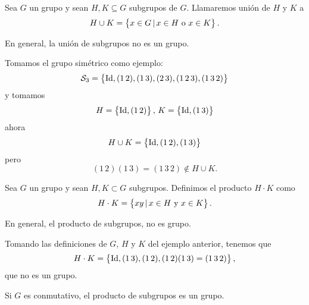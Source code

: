 \begin{defi}
    Sea $G$ un grupo y sean $H, K \subseteq G$ subgrupos de $G$. Llamaremos unión de $H$ y $K$ a
    \[
        H \cup K = \left\{x \in G \, \vert\, x \in H \text{ o } x \in K\right\}.
    \]
\end{defi}

\begin{obs}
    En general, la unión de subgrupos no es un grupo.
\end{obs}

\begin{example}
    Tomamos el grupo simétrico como ejemplo:
    \[
        \mathcal{S}_3 = \left\{ \operatorname{Id}, (1 \, 2), (1 \, 3), (2 \, 3), (1 \, 2 \, 3), (1 \, 3 \, 2)\right\}
    \]
    y tomamos
    \[
        H = \left\{\operatorname{Id}, (1 \, 2)\right\}, \, K = \left\{\operatorname{Id}, (1 \, 3)\right\}
    \]
    ahora
    \[
        H \cup K = \left\{\operatorname{Id}, (1 \, 2), (1\, 3)\right\}
    \]
    pero
    \[
        (1 \, 2)(1 \, 3) = (1 \, 3 \, 2) \notin H \cup K.
    \]
\end{example}

\begin{defi}
    Sea $G$ un grupo y sean $H, K \subset G$ subgrupos. Definimos el producto $H \cdot K$ como
    \[
        H \cdot K = \left\{xy \,\vert\, x \in H \text{ y } x \in K\right\}.
    \]
\end{defi}

\begin{obs}
    En general, el producto de subgrupos, no es grupo.
\end{obs}

\begin{example}
    Tomando las definiciones de $G$, $H$ y $K$ del ejemplo anterior, tenemos que
    \[
        H \cdot K = \left\{\operatorname{Id}, (1 \, 3), (1 \, 2), (1 \, 2)(1 \, 3) = (1 \, 3 \, 2)\right\},
    \]
    que no es un grupo.
\end{example}

\begin{obs}
    Si $G$ es conmutativo, el producto de subgrupos es un grupo.
\end{obs}

